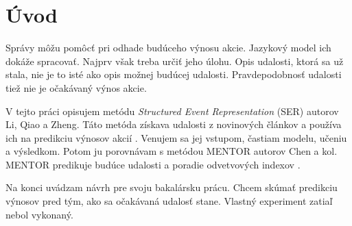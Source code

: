 \section{Úvod}
Správy môžu pomôcť pri odhade budúceho výnosu akcie. Jazykový model ich dokáže spracovať. Najprv však treba určiť jeho úlohu. Opis udalosti, ktorá sa už stala, nie je to isté ako opis možnej budúcej udalosti. Pravdepodobnosť udalosti tiež nie je očakávaný výnos akcie.

V tejto práci opisujem metódu \emph{Structured Event Representation} (SER) autorov Li, Qiao a Zheng. Táto metóda získava udalosti z novinových článkov a používa ich na predikciu výnosov akcií . Venujem sa jej vstupom, častiam modelu, učeniu a výsledkom. Potom ju porovnávam s metódou MENTOR autorov Chen a kol. MENTOR predikuje budúce udalosti a poradie odvetvových indexov .

Na konci uvádzam návrh pre svoju bakalársku prácu. Chcem skúmať predikciu výnosov pred tým, ako sa očakávaná udalosť stane. Vlastný experiment zatiaľ nebol vykonaný.
